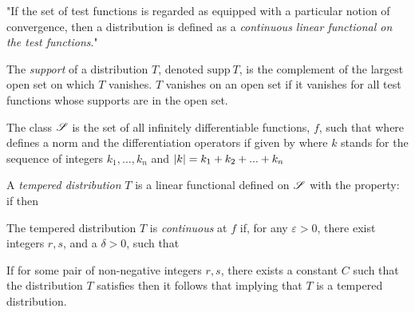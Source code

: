 \documentclass[oneside, 12pt, notitlepage]{book}
\begin{document}
"If the set of test functions is regarded as equipped with a particular notion of convergence, then a distribution is defined as a \emph{continuous linear functional on the test functions}."\par

\begin{definition}
	The \emph{support} of a distribution \(T\), denoted \(\text{supp}\ T\),  is the complement of the largest open set on which \(T\) vanishes. \(T\) vanishes on an open set if it vanishes for all test functions whose supports are in the open set.
\end{definition}

\begin{definition}
	The class \(\mathscr{S}\) is the set of all infinitely differentiable functions, \(f\), such that
	where
	defines a norm and the differentiation operators if given by
	where \(k\) stands for the sequence of integers \(k_1,...,k_n\) and \(\abs{k} = k_1 + k_2 + ... + k_n\)
\end{definition}

\begin{definition}
	A \emph{tempered distribution} \(T\) is a linear functional defined on \(\mathscr{S}\) with the property: if
	then
\end{definition}

\begin{definition}
	The tempered distribution \(T\) is \emph{continuous} at \(f\) if, for any \(\varepsilon>0\), there exist integers \(r,s\), and a \(\delta>0\), such that
\end{definition}

If for some pair of non-negative integers \(r,s\), there exists a constant \(C\) such that the distribution \(T\) satisfies
then it follows that
implying that \(T\) is a tempered distribution.\par





















\backmatter

\printbib
\end{document}

